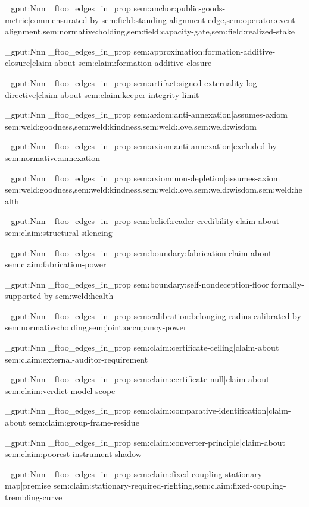 \prop_gput:Nnn \g_ftoo_edges_in_prop { sem:anchor:public-goods-metric|commensurated-by } { sem:field:standing-alignment-edge,sem:operator:event-alignment,sem:normative:holding,sem:field:capacity-gate,sem:field:realized-stake }

\prop_gput:Nnn \g_ftoo_edges_in_prop { sem:approximation:formation-additive-closure|claim-about } { sem:claim:formation-additive-closure }

\prop_gput:Nnn \g_ftoo_edges_in_prop { sem:artifact:signed-externality-log-directive|claim-about } { sem:claim:keeper-integrity-limit }

\prop_gput:Nnn \g_ftoo_edges_in_prop { sem:axiom:anti-annexation|assumes-axiom } { sem:weld:goodness,sem:weld:kindness,sem:weld:love,sem:weld:wisdom }

\prop_gput:Nnn \g_ftoo_edges_in_prop { sem:axiom:anti-annexation|excluded-by } { sem:normative:annexation }

\prop_gput:Nnn \g_ftoo_edges_in_prop { sem:axiom:non-depletion|assumes-axiom } { sem:weld:goodness,sem:weld:kindness,sem:weld:love,sem:weld:wisdom,sem:weld:health }

\prop_gput:Nnn \g_ftoo_edges_in_prop { sem:belief:reader-credibility|claim-about } { sem:claim:structural-silencing }

\prop_gput:Nnn \g_ftoo_edges_in_prop { sem:boundary:fabrication|claim-about } { sem:claim:fabrication-power }

\prop_gput:Nnn \g_ftoo_edges_in_prop { sem:boundary:self-nondeception-floor|formally-supported-by } { sem:weld:health }

\prop_gput:Nnn \g_ftoo_edges_in_prop { sem:calibration:belonging-radius|calibrated-by } { sem:normative:holding,sem:joint:occupancy-power }

\prop_gput:Nnn \g_ftoo_edges_in_prop { sem:claim:certificate-ceiling|claim-about } { sem:claim:external-auditor-requirement }

\prop_gput:Nnn \g_ftoo_edges_in_prop { sem:claim:certificate-null|claim-about } { sem:claim:verdict-model-scope }

\prop_gput:Nnn \g_ftoo_edges_in_prop { sem:claim:comparative-identification|claim-about } { sem:claim:group-frame-residue }

\prop_gput:Nnn \g_ftoo_edges_in_prop { sem:claim:converter-principle|claim-about } { sem:claim:poorest-instrument-shadow }

\prop_gput:Nnn \g_ftoo_edges_in_prop { sem:claim:fixed-coupling-stationary-map|premise } { sem:claim:stationary-required-righting,sem:claim:fixed-coupling-trembling-curve }

